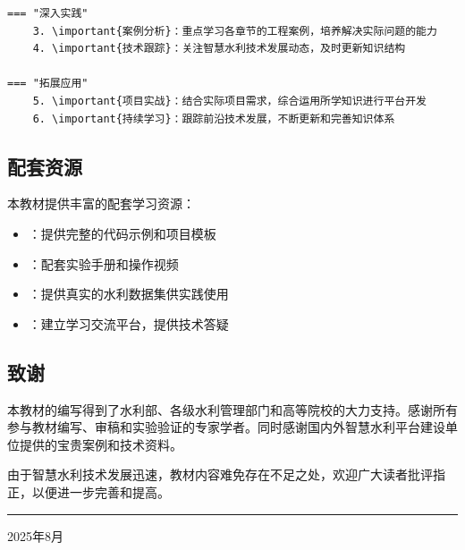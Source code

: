 \begin{verbatim}
=== "深入实践"
    3. \important{案例分析}：重点学习各章节的工程案例，培养解决实际问题的能力
    4. \important{技术跟踪}：关注智慧水利技术发展动态，及时更新知识结构
    
=== "拓展应用"
    5. \important{项目实战}：结合实际项目需求，综合运用所学知识进行平台开发
    6. \important{持续学习}：跟踪前沿技术发展，不断更新和完善知识体系
\end{verbatim}

\hypertarget{ux914dux5957ux8d44ux6e90-2}{%
\subsection{配套资源}\label{ux914dux5957ux8d44ux6e90-2}}

本教材提供丰富的配套学习资源：

\begin{itemize}
\tightlist
\item
  ：提供完整的代码示例和项目模板
\item
  ：配套实验手册和操作视频
\item
  ：提供真实的水利数据集供实践使用
\item
  ：建立学习交流平台，提供技术答疑
\end{itemize}

\hypertarget{ux81f4ux8c22-2}{%
\subsection{致谢}\label{ux81f4ux8c22-2}}

本教材的编写得到了水利部、各级水利管理部门和高等院校的大力支持。感谢所有参与教材编写、审稿和实验验证的专家学者。同时感谢国内外智慧水利平台建设单位提供的宝贵案例和技术资料。

由于智慧水利技术发展迅速，教材内容难免存在不足之处，欢迎广大读者批评指正，以便进一步完善和提高。

\begin{center}\rule{0.5\linewidth}{0.5pt}\end{center}


2025年8月